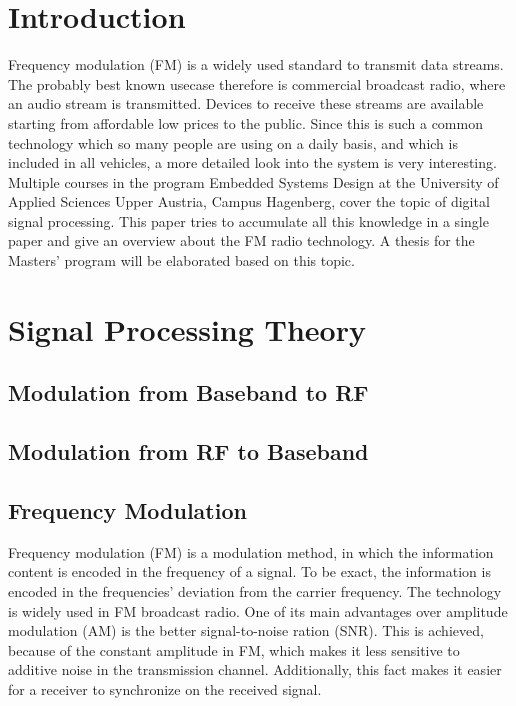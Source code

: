 \documentclass[conference]{IEEEtran}
\begin{document}
\section{Introduction}

  Frequency modulation (FM) is a widely used standard to transmit data streams.
  The probably best known usecase therefore is commercial broadcast radio, where an audio stream is transmitted.
  Devices to receive these streams are available starting from affordable low prices to the public.
  Since this is such a common technology which so many people are using on a daily basis, and which is included in all vehicles, a more detailed look into the system is very interesting.
  Multiple courses in the program Embedded Systems Design at the University of Applied Sciences Upper Austria, Campus Hagenberg, cover the topic of digital signal processing.
  This paper tries to accumulate all this knowledge in a single paper and give an overview about the FM radio technology.
  A thesis for the Masters' program will be elaborated based on this topic.

\section{Signal Processing Theory}



  \subsection{Modulation from Baseband to RF}


  \subsection{Modulation from RF to Baseband}

  \subsection{Frequency Modulation}
    Frequency modulation (FM) is a modulation method, in which the information content is encoded in the frequency of a signal.
    To be exact, the information is encoded in the frequencies' deviation from the carrier frequency.
    The technology is widely used in FM broadcast radio.
    One of its main advantages over amplitude modulation (AM) is the better signal-to-noise ration (SNR).
    This is achieved, because of the constant amplitude in FM, which makes it less sensitive to additive noise in the transmission channel.
    Additionally, this fact makes it easier for a receiver to synchronize on the received signal.
\end{document}
